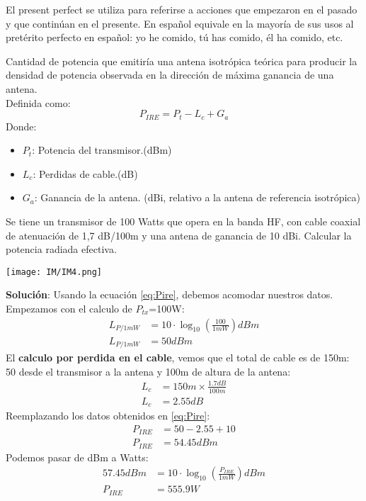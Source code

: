 \documentclass[
	12pt, %
	fleqn, %
	a4paper, %
]{LegrandOrangeBook}
\begin{document}
El present perfect se utiliza para referirse a acciones que empezaron en el pasado y que continúan en el presente. En español equivale en la mayoría de sus usos al pretérito perfecto en español: yo he comido, tú has comido, él ha comido, etc.
\begin{definition}
Cantidad de potencia que emitiría una antena isotrópica teórica para producir la densidad de potencia observada en la dirección de máxima ganancia de una antena.\\
Definida como:
\begin{equation}
\label{eq:Pire}
P_{IRE}=P_t-L_c+G_a
\end{equation}
Donde:\\
\begin{itemize}
\item $P_t$: Potencia del transmisor.(dBm)
\item $L_c$: Perdidas de cable.(dB)
\item $G_a$: Ganancia de la antena. (dBi, relativo a la antena de referencia isotrópica)
\end{itemize}
\end{definition}
\begin{example}
Se tiene un transmisor de 100 Watts que opera en la banda HF, con cable coaxial de atenuación de 1,7 dB/100m y una antena de ganancia de 10 dBi. Calcular la potencia radiada efectiva.\\
\begin{center}
\texttt{[image: IM/IM4.png]}
\end{center}
\textbf{Solución}:
Usando la ecuación \ref{eq:Pire}, debemos acomodar nuestros datos. Empezamos con el calculo de $P_{tx}$=100W:
\begin{align*}
L_{P/1mW}&=10\cdot \log_{10}\left(\frac{100}{1mW}\right)dBm\\
L_{P/1mW}&=50dBm
\end{align*}
El \textbf{calculo por perdida en el cable}, vemos que el total de cable es de 150m: 50 desde el transmisor a la antena y 100m de altura de la antena:
\begin{align*}
L_c&=150m\times\frac{1.7dB}{100m}\\
L_c&=2.55dB
\end{align*}
Reemplazando los datos obtenidos en \ref{eq:Pire}:
\begin{align*}
P_{IRE}&=50-2.55+10\\
P_{IRE}&=54.45 dBm
\end{align*}
Podemos pasar de dBm a Watts:
\begin{align*}
57.45dBm&=10\cdot \log_{10}\left(\frac{P_{IRE}}{1mW}\right)dBm\\
P_{IRE}&=555.9 W
\end{align*}
\end{example}
\end{document}
